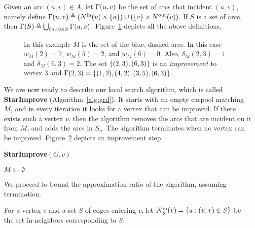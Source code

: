Given an arc $(u,v) \in A$, let $\inc(u,v)$ be the set of arcs that
incident $(u, v)$, namely define
\(
\inc(u,v) \eqdf (\nin[](u) \times \{u\}) \cup (\{v\} \times \nout[](v))
\).
If $S$ is a set of arcs, then $\inc(S) \eqdf \bigcup_{(u,v) \in
S} \inc(u,v)$.
%
Figure~\ref{fig:defs} depicts all the above definitions.

\begin{figure}
\centering

\caption{In this example $M$ is the set of the blue, dashed arcs.
In this case $w_M(2) = 7$, $w_M(5) = 2$, and $w_M(6) = 0$.  Also,
$\delta_M(2, 3) = 1$ and $\delta_M(6, 3) = 2$.  The set $\set{(2,3),
(6,3)}$ is an \emph{improvement} to vertex 3 and $\inc(2,3)
= \set{(1,2),(4,2),(3,5),(6,3)}$.}
\label{fig:defs}
\end{figure}

We are now ready to describe our local search algorithm, which is
called \textbf{StarImprove} (Algorithm~\ref{alg:grd}).  It starts with
an empty carpool matching $M$, and in every iteration it looks for a
vertex that can be improved.  If there exists such a vertex $v$, then
the algorithm removes the arcs that are incident on it from $M$, and
adds the arcs in $S_v$.  The algorithm terminates when no vertex can
be improved.  Figure~\ref{fig:improvement} depicts an improvement
step.

\begin{algorithm}
\caption{\textbf{StarImprove}$(G,c)$}
\label{alg:grd}
\begin{small}
$M \gets \emptyset$ \\
\end{small}
\end{algorithm}

\begin{figure}
\centering

\caption[]{
\label{fig:improvement}
}
\end{figure}

We proceed to bound the approximation ratio of the algorithm, assuming
termination.

For a vertex $v$ and a set $S$ of edges entering $v$, let $\nin[S](v)
= \set{u : (u,v) \in S}$ be the set in-neighbors corresponding to $S$.

